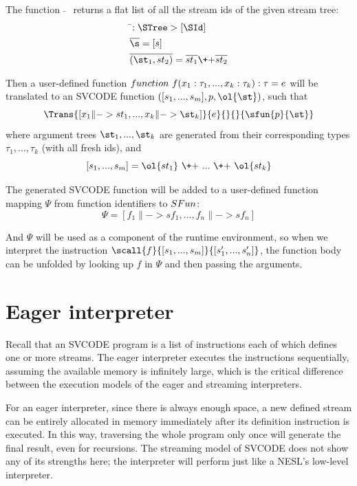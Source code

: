 The function $\bar{}$ \ returns a flat list of all the stream ids of the given stream tree:
	\begin{align*}
&\bar{}: \STree \-> [\SId] \\
&\overline{\s} = [s] \\
&\overline{(\st_1,st_2)} = \overline{st_1} {\++} \overline{st_2}
\end{align*}


Then a user-defined function $\*{function} \  f(x_1: \tau_1, ..., x_k: \tau_k): \tau = e $ will be translated to an SVCODE function
$([s_1,...,s_m], p, \ol{\st})$, 
such that $$\Trans{[x_1 \|-> st_1,..., x_k \|-> \st_k ]}{e}{}{}{\sfun{p}{\st}}$$ 
where argument trees $\st_1,...,\st_k$  are generated from their corresponding types $\tau_1,...,\tau_k$ (with all fresh ids), and
$$[s_1,...,s_m] = \ol{st_1} \ {\++} \ ... \ {\++} \ \ol{st_k}$$




The generated SVCODE function will be added to a user-defined function mapping $\Psi$ from function identifiers to $\*{SFun}$:
$$ \Psi = [f_1 \|-> sf_1,...,f_n \|-> sf_n] $$

And $\Psi$ will be used as a component of the runtime environment, so when we interpret the instruction $\scall{f}{[s_1,...,s_m]}{[s_1',...,s_n']}$, the function body can be unfolded by looking up $f$ in $\Psi$ and then passing the arguments.

\section{Eager interpreter}
Recall that an SVCODE program is a list of instructions each of which defines one or more streams. 
The eager interpreter executes the instructions sequentially, assuming the available memory is infinitely large, which is the critical difference between the execution models of the eager and streaming interpreters.

For an eager interpreter, since there is always enough space, a new defined stream can be entirely allocated in memory immediately after its definition instruction is executed.
In this way, traversing the whole program only once will generate the final result, even for recursions.
The streaming model of SVCODE does not show any of its strengths here; the interpreter will perform just like a NESL's low-level interpreter. 


